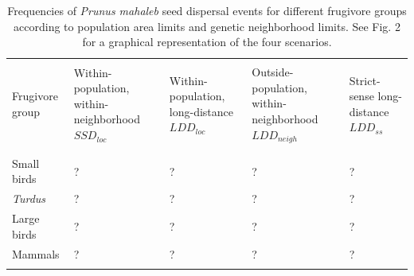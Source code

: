 \documentclass[a4paper, 12pt]{article}
\begin{document}
\newpage

\pagestyle{empty}
\begin{landscape}
\begin{table}
\captionsetup{width=21cm}%
\caption{Frequencies of \textit{Prunus mahaleb} seed dispersal events for different frugivore groups according to population area limits and genetic neighborhood limits. See Fig. 2 for a graphical representation of the four scenarios.}
\vspace{0.5cm}
    \begin{tabular}{lp{3cm}p{3cm}p{3cm}p{3cm}}
    \hline \\
    Frugivore group & Within-population, within-neighborhood $SSD_{loc}$ & Within-population, long-distance $LDD_{loc}$ & Outside-population, within-neighborhood $LDD_{neigh}$ & Strict-sense long-distance $LDD_{ss}$ \\\\ \hline \\
    Small birds     & ?~           & ?~            & ?~           & ?~  \\
    \textit{Turdus} & ?~           & ?~            & ?~           & ?~  \\

    Large birds     & ?~           & ?~            & ?~           & ?~  \\

    Mammals         & ?~           & ?~            & ?~           & ?~  \\\\
\hline
    \end{tabular}
\end{table}
\end{landscape}

 
\newpage 
 
\end{document}
